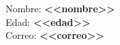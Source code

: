 \documentclass{article}
\begin{document}
Nombre: \textbf{<<nombre>>} \\
Edad: \textbf{<<edad>>} \\
Correo: \textbf{<<correo>>}
\end{document}
